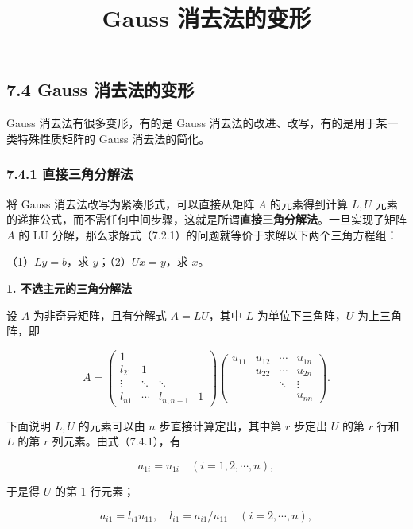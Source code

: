 \documentclass[
  10pt,
  fontset=fandol]{ctexart}
\title{Gauss 消去法的变形}
\author{}
\date{}
\begin{document}
\maketitle

\subsection{7.4 Gauss 消去法的变形}\label{gauss-ux6d88ux53bbux6cd5ux7684ux53d8ux5f62}

Gauss 消去法有很多变形，有的是 Gauss 消去法的改进、改写，有的是用于某一类特殊性质矩阵的 Gauss 消去法的简化。

\subsubsection{7.4.1 直接三角分解法}\label{ux76f4ux63a5ux4e09ux89d2ux5206ux89e3ux6cd5}

将 Gauss 消去法改写为紧凑形式，可以直接从矩阵 \(A\) 的元素得到计算 \(L,U\) 元素的递推公式，而不需任何中间步骤，这就是所谓\textbf{直接三角分解法}。一旦实现了矩阵 \(A\) 的 LU 分解，那么求解式（7.2.1）的问题就等价于求解以下两个三角方程组：

（1）\(Ly=b\)，求 \(y\)；（2）\(Ux=y\)，求 \(x\)。

\textbf{1. 不选主元的三角分解法}

设 \(A\) 为非奇异矩阵，且有分解式 \(A=LU\)，其中 \(L\) 为单位下三角阵，\(U\) 为上三角阵，即

\[
A=\begin{pmatrix}
1&&&\\
l_{21}&1&&\\
\vdots&\ddots&\ddots&\\
l_{n1}&\cdots&l_{n,n-1}&1
\end{pmatrix}
\begin{pmatrix}
u_{11}&u_{12}&\cdots&u_{1n}\\
&u_{22}&\cdots&u_{2n}\\
&&\ddots&\vdots\\
&&&u_{nn}
\end{pmatrix}.
\tag{7.4.1}
\]

下面说明 \(L,U\) 的元素可以由 \(n\) 步直接计算定出，其中第 \(r\) 步定出 \(U\) 的第 \(r\) 行和 \(L\) 的第 \(r\) 列元素。由式（7.4.1），有

\[a_{1i}=u_{1i}\quad(i=1,2,\cdots,n),\]

于是得 \(U\) 的第 1 行元素；

\[a_{i1}=l_{i1}u_{11},\quad l_{i1}=a_{i1}/u_{11}\quad(i=2,\cdots,n),\]
\end{document}
